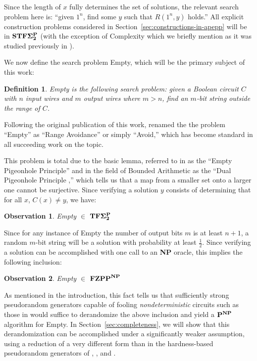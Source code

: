 \documentclass[11pt]{article}
\newtheorem{observation}{Observation}
\newtheorem{definition}{Definition}
\def\cl{\bf}
\begin{document}
Since the length of $x$ fully determines the set of solutions, the relevant search problem here is: ``given $1^n$, find some $y$ such that $R(1^n,y)$ holds.'' All explicit construction problems considered in Section~\ref{sec:constructions-in-apepp} will be in ${\cl STF\Sigma_2^P}$ (with the exception of {\sc Complexity} which we briefly mention as it was studied previously in \cite{total}).

We now define the search problem {\sc Empty}, which will be the primary subject of this work:
\begin{definition}
{\sc Empty} is the following search problem: given a Boolean circuit $C$ with $n$ input wires and $m$ output wires where $m>n$, find an $m$-bit string outside the range of $C$.
\end{definition}

Following the original publication of this work, \cite{RSW} renamed the the problem ``{\sc Empty}'' as ``{\sc Range Avoidance}'' or simply ``{\sc Avoid},'' which has become standard in all succeeding work on the topic. 

This problem is total due to the basic lemma, referred to in \cite{total} as the ``Empty Pigeonhole Principle'' and in the field of Bounded Arithmetic as the ``Dual Pigeonhole Principle \cite{Jerabek},'' which tells us that a map from a smaller set onto a larger one cannot be surjective. Since verifying a solution $y$ consists of determining that for all $x$, $C(x) \neq y$, we have:
\begin{observation}
{\sc Empty} $\in$ ${\cl TF\Sigma^{\cl P}_2}$
\end{observation}

Since for any instance of {\sc Empty} the number of output bits $m$ is at least $n+1$, a random $m$-bit string will be a solution with probability at least $\frac{1}{2}$. Since verifying a solution can be accomplished with one call to an {\cl NP} oracle, this implies the following inclusion:

\begin{observation}
{\sc Empty} $\in$ ${\cl FZPP}^{\cl NP}$
\end{observation}

As mentioned in the introduction, this fact tells us that sufficiently strong pseudorandom generators capable of fooling \emph{nondeterministic} circuits such as those in \cite{AM-derandomization} would suffice to derandomize the above inclusion and yield a ${\cl P}^{\cl NP}$ algorithm for {\sc Empty}. In Section~\ref{sec:completeness}, we will show that this derandomization can be accomplished under a significantly weaker assumption, using a reduction of a very different form than in the hardness-based pseudorandom generators of \cite{NW}, \cite{IW}, and \cite{AM-derandomization}.
\end{document}
